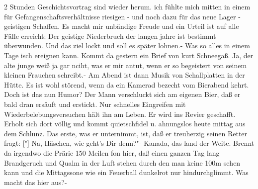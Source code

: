 \def\day{5. Mai 1944.}
\mktitle

2 Stunden Geschichtsvortrag sind wieder herum.
ich f\"{u}hlte mich mitten in einem f\"{u}r Gefangenschaftsverh\"{a}ltnisse riesigen - und noch dazu f\"{u}r das neue Lager - geistigen Schaffen.
Es macht mir unb\"{a}ndige Freude und ein Urteil ist auf alle F\"{a}lle erreicht: Der geistige Niederbruch der langen jahre ist bestimmt \"{u}berwunden.
Und das ziel lockt und soll es sp\"{a}ter lohnen.-
Was so alles in einem Tage isch ereignen kann.
Kommt da gestern ein Brief von kurt Schneega{\ss}.
Ja, der alte junge wei{\ss} ja gar nciht, was er mir antut, wenn er so begeistert von seinem kleinen Frauchen schreibt.-
Am Abend ist dann Musik von Schallplatten in der H\"{u}tte.
Es ist wohl st\"{o}rend, wenn da ein Kamerad bezecht vom Bierabend kehrt.
Doch ist das nun Humor?
Der Mann verschluckt sich am eigenen Bier, da{\ss} er bald dran ers\"{a}uft und erstickt.
Nur schnelles Eingreifen mit Wiederbelebungsversuchen h\"{a}lt ihn am Leben.
Er wird ins Revier geschafft.
Erholt sich dort v\"{o}llig und kommt quietschfidel u. ahnungslos heute mittag aus dem Schlunz.
Das erste, was er unternimmt, ist, da{\ss} er treuherzig seinen Retter fragt: {\color{red} ["] }Na, H\"{a}schen, wie geht's Dir denn?"-
Kanada, das land der Weite.
Brennt da irgendwo die Pr\"{a}rie 150 Meilen fon hier, da{\ss} einen ganzen Tag lang Brandgeruch und Qualm in der Luft stehen durch den man keine 100m sehen kann und die Mittagssone wie ein Feuerball dunkelrot nur hindurchglimmt.
Was macht das hier aus?-

\clearpage
